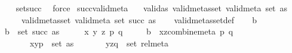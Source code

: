 \begin{isabellebody}
%
\isadelimproof
\ \ %
\endisadelimproof
%
\isatagproof
{}\isamarkupfalse%
\ set{\isacharunderscore}{\kern0pt}succ\ \isamarkupfalse%
\ force%
\endisatagproof
{\isafoldproof}%
%
\isadelimproof
\isanewline
%
\endisadelimproof
\isanewline
{}\isamarkupfalse%
\ succ{\isacharunderscore}{\kern0pt}valid{\isacharunderscore}{\kern0pt}meta{\isacharcolon}{\kern0pt}\isanewline
\ \ \ valid{\isacharunderscore}{\kern0pt}as{\isacharcolon}{\kern0pt}\ {\isachardoublequoteopen}valid{\isacharunderscore}{\kern0pt}metas{\isacharunderscore}{\kern0pt}set\ valid{\isacharunderscore}{\kern0pt}meta\ {\isacharparenleft}{\kern0pt}set\ as{\isacharparenright}{\kern0pt}{\isachardoublequoteclose}\isanewline
\ \ \ \ \ {\isachardoublequoteopen}valid{\isacharunderscore}{\kern0pt}metas{\isacharunderscore}{\kern0pt}set\ valid{\isacharunderscore}{\kern0pt}meta\ {\isacharparenleft}{\kern0pt}set\ {\isacharparenleft}{\kern0pt}succ\ as{\isacharparenright}{\kern0pt}{\isacharparenright}{\kern0pt}{\isachardoublequoteclose}\isanewline
%
\isadelimproof
\ \ %
\endisadelimproof
%
\isatagproof
{}\isamarkupfalse%
\ valid{\isacharunderscore}{\kern0pt}metas{\isacharunderscore}{\kern0pt}set{\isacharunderscore}{\kern0pt}def\isanewline
{}\isamarkupfalse%
\isanewline
\ \ \isamarkupfalse%
\ b\isanewline
\ \ \isamarkupfalse%
\ {\isachardoublequoteopen}b\ {\isasymin}\ set\ {\isacharparenleft}{\kern0pt}succ\ as{\isacharparenright}{\kern0pt}{\isachardoublequoteclose}\isanewline
\ \ \isamarkupfalse%
\ \isamarkupfalse%
\ x\ y\ z\ p\ q\isanewline
\ \ \ \ \ {\isachardoublequoteopen}b\ {\isacharequal}{\kern0pt}\ {\isacharparenleft}{\kern0pt}{\isacharparenleft}{\kern0pt}x{\isacharcomma}{\kern0pt}z{\isacharparenright}{\kern0pt}{\isacharcomma}{\kern0pt}combine{\isacharunderscore}{\kern0pt}meta\ p\ q{\isacharparenright}{\kern0pt}{\isachardoublequoteclose}\isanewline
\ \ \ \ \ \ \ {\isachardoublequoteopen}{\isacharparenleft}{\kern0pt}{\isacharparenleft}{\kern0pt}x{\isacharcomma}{\kern0pt}y{\isacharparenright}{\kern0pt}{\isacharcomma}{\kern0pt}p{\isacharparenright}{\kern0pt}\ {\isasymin}\ set\ as{\isachardoublequoteclose}\isanewline
\ \ \ \ \ \ \ {\isachardoublequoteopen}{\isacharparenleft}{\kern0pt}{\isacharparenleft}{\kern0pt}y{\isacharcomma}{\kern0pt}z{\isacharparenright}{\kern0pt}{\isacharcomma}{\kern0pt}q{\isacharparenright}{\kern0pt}\ {\isasymin}\ set\ rel{\isacharunderscore}{\kern0pt}meta{\isachardoublequoteclose}\ \isamarkupfalse%

\end{isabellebody}
